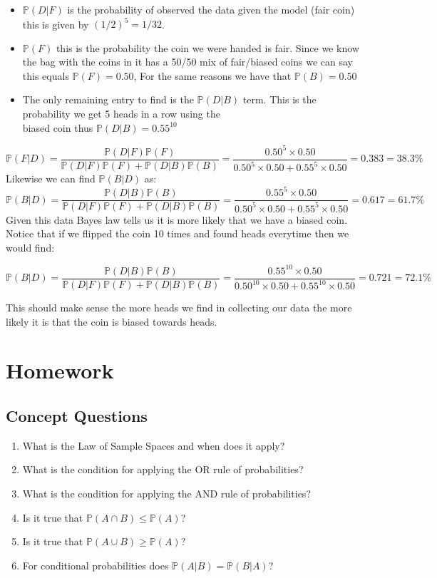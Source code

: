\documentclass[
]{book}
\providecommand{\tightlist}{%
  \setlength{\itemsep}{0pt}\setlength{\parskip}{0pt}}
\newcommand{\prob}[1]{{\mathbb{P}(#1)}}
\theoremstyle{definition}
\theoremstyle{definition}
\theoremstyle{definition}
\theoremstyle{definition}
\theoremstyle{remark}
\begin{document}
\begin{itemize}
\tightlist
\item
  \(\prob{D|F}\) is the probability of observed the data given the model (fair coin) this is given by \((1/2)^5=1/32\).
\item
  \(\prob{F}\) this is the probability the coin we were handed is fair. Since we know the bag with the coins in it has a 50/50 mix of fair/biased coins we can say this equals \(\prob{F}=0.50\), For the same reasons we have that \(\prob{B}=0.50\)
\item
  The only remaining entry to find is the \(\prob{D|B}\) term. This is the probability we get 5 heads in a row using the\\
  biased coin thus \(\prob{D|B}=0.55^{10}\)
\end{itemize}

\[
\prob{F|D}=\frac{\prob{D|F}\prob{F}}{\prob{D|F}\prob{F}+\prob{D|B}\prob{B}}=\frac{0.50^5\times 0.50}{0.50^5 \times 0.50+0.55^5\times 0.50}=0.383=38.3\%
\]
Likewise we can find \(\prob{B|D}\) as:
\[
\prob{B|D}=\frac{\prob{D|B}\prob{B}}{\prob{D|F}\prob{F}+\prob{D|B}\prob{B}}=\frac{0.55^5\times 0.50}{0.50^5 \times 0.50+0.55^5\times 0.50}=0.617=61.7\%
\]
Given this data Bayes law tells us it is more likely that we have a biased coin. Notice that if we flipped the coin 10 times and found heads everytime then we would find:

\[
\prob{B|D}=\frac{\prob{D|B}\prob{B}}{\prob{D|F}\prob{F}+\prob{D|B}\prob{B}}=\frac{0.55^{10}\times 0.50}{0.50^{10} \times 0.50+0.55^{10}\times 0.50}=0.721=72.1\%
\]

This should make sense the more heads we find in collecting our data the more likely it is that the coin is biased towards heads.

\hypertarget{homework-4}{%
\section{Homework}\label{homework-4}}

\hypertarget{concept-questions-4}{%
\subsection{Concept Questions}\label{concept-questions-4}}

\begin{enumerate}
\def\labelenumi{\arabic{enumi}.}
\tightlist
\item
  What is the Law of Sample Spaces and when does it apply?
\item
  What is the condition for applying the OR rule of probabilities?
\item
  What is the condition for applying the AND rule of probabilities?
\item
  Is it true that \(\prob{A \cap B} \leq \prob{A}\)?
\item
  Is it true that \(\prob{A \cup B} \geq \prob{A}\)?
\item
  For conditional probabilities does \(\prob{A|B}=\prob{B|A}\)?
\end{enumerate}
\end{document}
